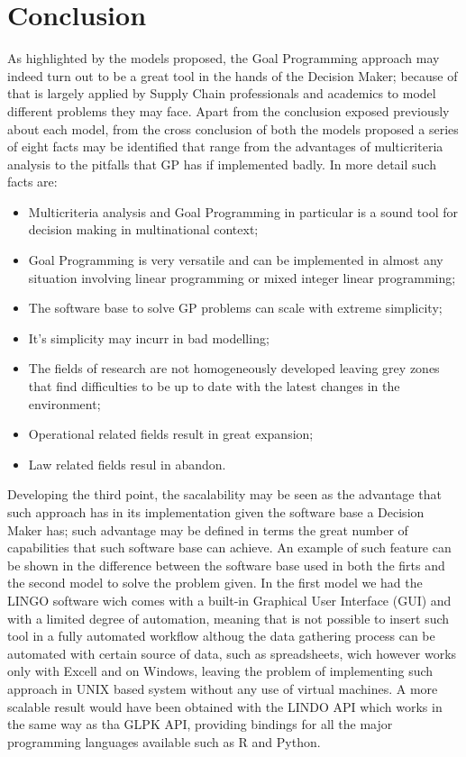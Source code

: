 \clearpage{\pagestyle{empty}\cleardoublepage}
\chapter*{Conclusion}

\begin{doublespace}
As highlighted by the models proposed, the Goal Programming approach may indeed turn out to be a great tool in the hands of the Decision Maker; because of that is largely applied by Supply Chain professionals and academics to model different problems they may face. Apart from the conclusion exposed previously about each model, from the cross conclusion of both the models proposed a series of eight facts may be identified that range from the advantages of multicriteria analysis to the pitfalls that GP has if implemented badly. In more detail such facts are:
\begin{itemize}
	\item Multicriteria analysis and Goal Programming in particular is a sound tool for decision making in multinational context;
	\item Goal Programming is very versatile and can be implemented in almost any situation involving linear programming or mixed integer linear programming;
	\item The software base to solve GP problems can scale with extreme simplicity;
	\item It's simplicity may incurr in bad modelling;
	\item The fields of research are not homogeneously developed leaving grey zones that find difficulties to be up to date with the latest changes in the environment;
	\item Operational related fields result in great expansion;
	\item Law related fields resul in abandon.
\end{itemize}
Developing the third point, the sacalability may be seen as the advantage that such approach has in its implementation given the software base a Decision Maker has; such advantage may be defined in terms the great number of capabilities that such software base can achieve. An example of such feature can be shown in the difference between the software base used in both the firts and the second model to solve the problem given.
In the first model we had the LINGO software wich comes with a built-in Graphical User Interface (GUI) and  with a limited degree of automation, meaning that is not possible to insert such tool in a fully automated workflow althoug the data gathering process can be automated with certain source of data, such as spreadsheets, wich however works only with Excell and on Windows, leaving the problem of implementing such approach in UNIX based system without any use of virtual machines. A more scalable result would have been obtained with the LINDO API which works in the same way as tha GLPK API,  providing bindings for all the major programming languages available such as R and Python. 

\end{doublespace}
